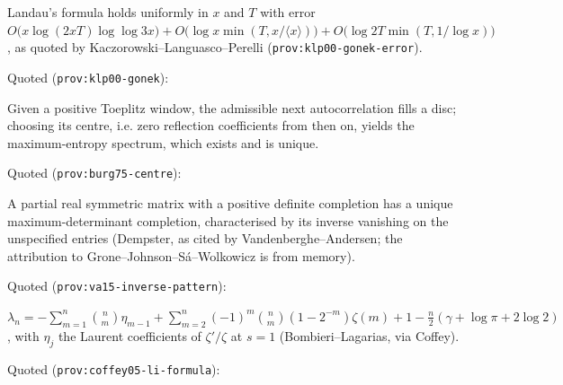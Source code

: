 \begin{citedfact}
\label{cit:gonek-uniform-landau}
Landau's formula holds uniformly in $x$ and $T$ with error
$O\big(x\log(2xT)\log\log3x\big)+O\big(\log x\min(T,x/\langle x\rangle)\big)+O\big(\log2T\min(T,1/\log x)\big)$,
as quoted by Kaczorowski--Languasco--Perelli (\texttt{prov:klp00-gonek-error}).

\par\noindent Quoted (\texttt{prov:klp00-gonek}):
{\small\texttt{}}
\end{citedfact}

\begin{citedfact}
\label{cit:burg-maxent}
Given a positive Toeplitz window, the admissible next autocorrelation fills a disc; choosing its centre, i.e.
zero reflection coefficients from then on, yields the maximum-entropy spectrum, which exists and is unique.

\par\noindent Quoted (\texttt{prov:burg75-centre}):
{\small\texttt{}}
\end{citedfact}

\begin{citedfact}
\label{cit:maxdet-completion}
A partial real symmetric matrix with a positive definite completion has a unique maximum-determinant
completion, characterised by its inverse vanishing on the unspecified entries (Dempster, as cited by
Vandenberghe--Andersen; the attribution to Grone--Johnson--S\'a--Wolkowicz is from memory).

\par\noindent Quoted (\texttt{prov:va15-inverse-pattern}):
{\small\texttt{}}
\end{citedfact}

\begin{citedfact}
\label{cit:li-arithmetic-formula}
$\lambda_n = -\sum_{m=1}^n\binom nm\eta_{m-1}+\sum_{m=2}^n(-1)^m\binom nm(1-2^{-m})\zeta(m)+1-\tfrac n2(\gamma+\log\pi+2\log2)$,
with $\eta_j$ the Laurent coefficients of $\zeta'/\zeta$ at $s = 1$ (Bombieri--Lagarias, via Coffey).

\par\noindent Quoted (\texttt{prov:coffey05-li-formula}):
{\small\texttt{}}
\end{citedfact}

